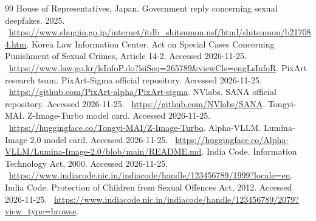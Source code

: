 \documentclass[11pt,a4paper]{article}
\begin{document}
\begin{thebibliography}{99}
 House of Representatives, Japan. Government reply concerning sexual deepfakes. 2025. \ \url{https://www.shugiin.go.jp/internet/itdb_shitsumon.nsf/html/shitsumon/b217084.htm}.
 Korea Law Information Center. Act on Special Cases Concerning Punishment of Sexual Crimes, Article 14-2. Accessed 2026-11-25. \ \url{https://www.law.go.kr/lsInfoP.do?lsiSeq=265789&viewCls=engLsInfoR}.
 PixArt research team. PixArt-Sigma official repository. Accessed 2026-11-25. \ \url{https://github.com/PixArt-alpha/PixArt-sigma}.
 NVlabs. SANA official repository. Accessed 2026-11-25. \ \url{https://github.com/NVlabs/SANA}.
 Tongyi-MAI. Z-Image-Turbo model card. Accessed 2026-11-25. \ \url{https://huggingface.co/Tongyi-MAI/Z-Image-Turbo}.
 Alpha-VLLM. Lumina-Image 2.0 model card. Accessed 2026-11-25. \ \url{https://huggingface.co/Alpha-VLLM/Lumina-Image-2.0/blob/main/README.md}.
 India Code. Information Technology Act, 2000. Accessed 2026-11-25. \ \url{https://www.indiacode.nic.in/indiacode/handle/123456789/1999?locale=en}.
 India Code. Protection of Children from Sexual Offences Act, 2012. Accessed 2026-11-25. \ \url{https://www.indiacode.nic.in/indiacode/handle/123456789/2079?view_type=browse}.
\end{thebibliography}
\end{document}
